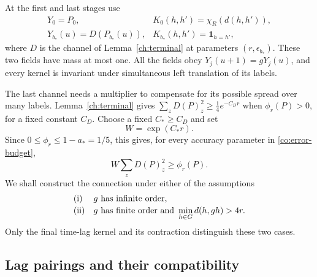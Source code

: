 At the first and last stages use
\begin{equation}
 \begin{array}{lll}
 Y_0=P_0,&
 K_0(h,h')=\chi_R(d(h,h')),\\[2pt]
 Y_{b_*}(u)=D(P_{b_*}(u)),&
 K_{b_*}(h,h')=\mathbf1_{h=h'},
 \end{array}
 \label{co:end-fields}
\end{equation}
where $D$ is the channel of Lemma~\ref{ch:terminal} at parameters
$(r,\epsilon_{b_*})$.  These two fields have mass at most one.  All the
fields obey $Y_j(u+1)=gY_j(u)$, and every kernel is invariant under
simultaneous left translation of its labels.

The last channel needs a multiplier to compensate for its possible
spread over many labels.  Lemma~\ref{ch:terminal} gives
$\sum_zD(P)_z^2\geq\frac14e^{-C_Dr}$ when $\phi_r(P)>0$, for a fixed
constant $C_D$.  Choose a fixed $C_*\geq C_D$ and set
\begin{equation}
 W=\exp(C_*r).
 \label{co:accuracy}
\end{equation}
Since $0\leq\phi_r\leq1-a_*=1/5$, this gives, for every accuracy
parameter in \eqref{co:error-budget},
\begin{equation}
 W\sum_zD(P)_z^2\geq\phi_r(P).
 \label{co:terminal-multiplier}
\end{equation}
We shall construct the connection under either of the assumptions
\begin{equation}
 \begin{array}{ll}
 \textnormal{(i)}&g\text{ has infinite order},\\[2pt]
 \textnormal{(ii)}&g\text{ has finite order and }
                \displaystyle\min_{h\in G}d(h,gh)>4r.
 \end{array}
 \label{co:twist-assumption}
\end{equation}
Only the final time-lag kernel and its contraction distinguish these two
cases.

\subsection{Lag pairings and their compatibility}

